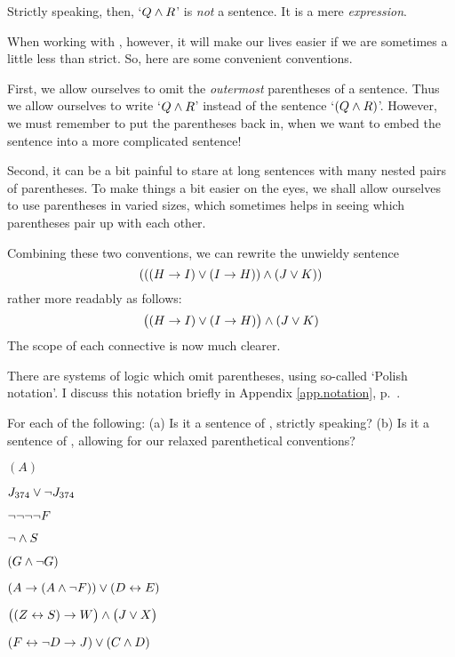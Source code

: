 Strictly speaking, then, `$Q \wedge R$' is \emph{not} a sentence. It is a mere \emph{expression}.

When working with \TFL, however, it will make our lives easier if we are sometimes a little less than strict. So, here are some convenient conventions.

First,  we allow ourselves to omit the \emph{outermost} parentheses of a sentence. Thus we allow ourselves to write `$Q \wedge R$' instead of the sentence `$(Q \wedge R)$'. However, we must remember to put the parentheses back in, when we want to embed the sentence into a more complicated sentence!

Second, it can be a bit painful to stare at long sentences with many nested pairs of parentheses. To make things a bit easier on the eyes, we shall allow ourselves to use parentheses in varied sizes, which sometimes helps in seeing which parentheses pair up with each other.


Combining these two conventions, we can rewrite the unwieldy sentence
$$(((H \rightarrow I) \vee (I \rightarrow H)) \wedge (J \vee K))$$
rather more readably as follows:
$$\bigl( (H \rightarrow I) \vee (I \rightarrow H) \bigr) \wedge (J \vee K)$$
The scope of each connective is now much clearer.

There are systems of logic which omit parentheses, using so-called `Polish notation'. I discuss this notation briefly in Appendix \ref{app.notation}, p.~\pageref{polish}. 


\practiceproblems

\solutions
\problempart
\label{pr.wiffTFL}
For each of the following: (a) Is it a sentence of \TFL, strictly speaking? (b) Is it a sentence of \TFL, allowing for our relaxed parenthetical conventions?
\begin{earg}
\item $(A)$
\item $J_{374} \vee \neg J_{374}$
\item $\neg \neg \neg \neg F$
\item $\neg \wedge S$
\item $(G \wedge \neg G)$
\item $(A \rightarrow (A \wedge \neg F)) \vee (D \leftrightarrow E)$
\item $\bigl( (Z \leftrightarrow S) \rightarrow W \bigr) \wedge \bigl(J \vee X\bigr)$
\item $(F \leftrightarrow \neg D \rightarrow J) \vee (C \wedge D)$
\end{earg}

